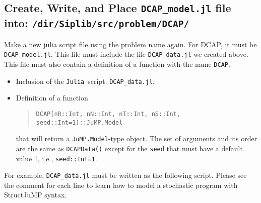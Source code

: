 \documentclass[11pt]{article}
\newcommand{\dcap}{\textsf{DCAP}}
\newcommand{\julia}{\texttt{Julia}}
\newcommand{\jumpmodel}{\texttt{JuMP.Model}}
\begin{document}
\subsection{Create, Write, and Place \texttt{DCAP\_model.jl} file into: \texttt{/dir/Siplib/src/problem/DCAP/}}
Make a new julia script file using the problem name again. For \dcap, it must be \texttt{DCAP\_model.jl}. This file must include the file \texttt{DCAP\_data.jl} we created above. This file must also contain a definition of a function with the name \texttt{DCAP}.
\begin{itemize}
	\item Inclusion of the \julia\ script: \texttt{DCAP\_data.jl}.
	\item Definition of a function
	\begin{quote}\centering\noindent\texttt{DCAP(nR::Int, nN::Int, nT::Int, nS::Int, seed::Int=1)::JuMP.Model
	}\end{quote}
	that will return a \jumpmodel-type object. The set of arguments and its order are the same as \texttt{DCAPData()} except for the \texttt{seed} that must have a default value 1, i.e., \texttt{seed::Int=1}.
\end{itemize}
For example, \texttt{DCAP\_data.jl} must be written as the following script. Please see the comment for each line to learn how to model a stochastic program with StructJuMP syntax.
\end{document}

